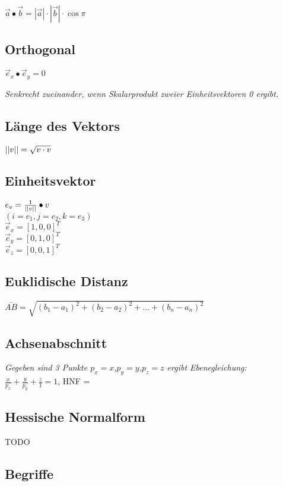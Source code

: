 $\vec{a} \bullet \vec{b} = |\vec{a}| \cdot |\vec{b}| \cdot \cos \pi$

\subsection{Orthogonal}

$\vec{e}_x \bullet \vec{e}_y = 0$

\textit{
    Senkrecht zueinander, wenn Skalarprodukt zweier Einheitsvektoren 0 ergibt.
}

\subsection{Länge des Vektors}
$ \lvert\lvert v \rvert\rvert = \sqrt{v \cdot v} $

\subsection{Einheitsvektor}

$ e_v = \frac{1}{\lvert\lvert v \rvert\rvert} \bullet v $ \\
$ ( i = e_1, j = e_2, k = e_3 ) $ \\

\textit{$\vec{e}_x = [1,0,0]^T$}\\
\textit{$\vec{e}_y = [0,1,0]^T$}\\
\textit{$\vec{e}_z = [0,0,1]^T$}

\subsection{Euklidische Distanz}

$\bar{AB} = \sqrt{(b_1-a_1)^2 + (b_2 - a_2)^2 + \dots + (b_n - a_n)^2}$

\subsection{Achsenabschnitt}

\textit{Gegeben sind 3 Punkte $p_x = x$,$p_y = y$,$p_z = z$ ergibt Ebenegleichung:} \\

$\frac{x}{p_x} + \frac{y}{p_y} + \frac{z}{1} = 1$,
HNF = $\frac{}{}$

\subsection{Hessische Normalform}

TODO

\subsection{Begriffe}

